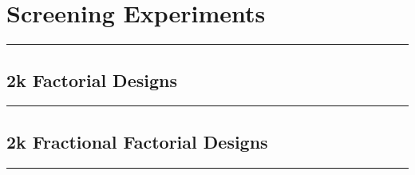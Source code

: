 \section{Screening Experiments}
\noindent\rule[\linienAbstand]{\linewidth}{\linienDickeDick}

\subsection{2k Factorial Designs}
\noindent\rule[\linienAbstand]{\linewidth}{\linienDicke}
\subsection{2k Fractional Factorial Designs}
\noindent\rule[\linienAbstand]{\linewidth}{\linienDicke}
